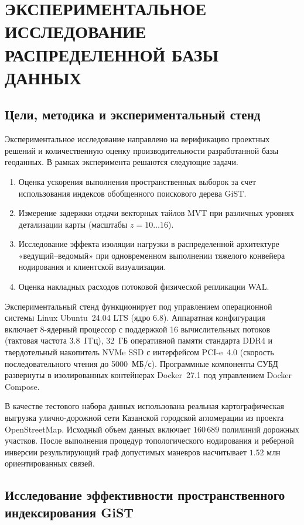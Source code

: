 \chapter{ЭКСПЕРИМЕНТАЛЬНОЕ ИССЛЕДОВАНИЕ РАСПРЕДЕЛЕННОЙ БАЗЫ ДАННЫХ}
\label{chap:experiments}

\section{Цели, методика и экспериментальный стенд}
\label{sec:exp_setup}

Экспериментальное исследование направлено на верификацию проектных решений и количественную оценку производительности разработанной базы геоданных. В рамках эксперимента решаются следующие задачи.
\begin{enumerate}
    \item Оценка ускорения выполнения пространственных выборок за счет использования индексов обобщенного поискового дерева GiST.
    \item Измерение задержки отдачи векторных тайлов MVT при различных уровнях детализации карты (масштабы $z=10\dots16$).
    \item Исследование эффекта изоляции нагрузки в распределенной архитектуре «ведущий--ведомый» при одновременном выполнении тяжелого конвейера нодирования и клиентской визуализации.
    \item Оценка накладных расходов потоковой физической репликации WAL.
\end{enumerate}

Экспериментальный стенд функционирует под управлением операционной системы Linux Ubuntu~24.04 LTS (ядро 6.8). Аппаратная конфигурация включает 8-ядерный процессор с поддержкой 16 вычислительных потоков (тактовая частота 3.8~ГГц), 32~ГБ оперативной памяти стандарта DDR4 и твердотельный накопитель NVMe SSD с интерфейсом PCI-e~4.0 (скорость последовательного чтения до 5000~МБ/с). Программные компоненты СУБД развернуты в изолированных контейнерах Docker~27.1 под управлением Docker Compose.

В качестве тестового набора данных использована реальная картографическая выгрузка улично-дорожной сети Казанской городской агломерации из проекта OpenStreetMap. Исходный объем данных включает $160\,689$ полилиний дорожных участков. После выполнения процедур топологического нодирования и реберной инверсии результирующий граф допустимых маневров насчитывает $1.52$ млн ориентированных связей.

\section{Исследование эффективности пространственного индексирования GiST}
\label{sec:gist_benchmark}

